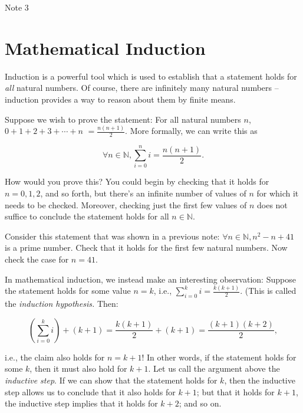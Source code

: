 \documentclass[12pt,a4paper]{article}
\theoremstyle{definition}
\begin{document}
\raggedright

\begin{center}
\huge{Note 3}
\end{center}

\section*{Mathematical Induction}
Induction is a powerful tool which is used to establish that a statement holds  for \textit{all} natural numbers. Of course, there are infinitely many natural numbers -- induction provides a way to reason about them by finite means.

\bigbreak

Suppose we wish to prove the statement: For all natural numbers $n$, $0+1+2+3+\cdots+n$ $=\frac{n(n+1)}{2}$. More formally, we can write this as

\begin{equation}
\forall n\in\mathbb{N}, \sum_{i=0}^{n}i=\frac{n(n+1)}{2}.
\end{equation}

How would you prove this? You could begin by checking that it holds for $n=0, 1, 2$, and so forth, but there's an infinite number of values of $n$ for which it needs to be checked. Moreover, checking just the first few values of $n$ does not suffice to conclude the statement holds for all $n\in\mathbb{N}$.

\bigbreak

Consider this statement that was shown in a previous note: $\forall n\in\mathbb{N}, n^2-n+41$ is a prime number. Check that it holds for the first few natural numbers. Now check the case for $n=41$.

\bigbreak

In mathematical induction, we instead make an interesting observation: Suppose the statement holds for some value $n=k$, i.e., $\sum_{i=0}^{k}i=\frac{k(k+1)}{2}$. (This is called the \textit{induction hypothesis.} Then:

\begin{equation}
\left(\sum_{i=0}^{k}i\right)+(k+1)=\frac{k(k+1)}{2}+(k+1)=\frac{(k+1)(k+2)}{2},
\end{equation}

i.e., the claim also holds for $n=k+1$! In other words, if the statement holds for some $k$, then it must also hold for $k+1$. Let us call the argument above the \textit{inductive step}. If we can show that the statement holds for $k$, then the inductive step allows us to conclude that it also holds for $k+1$; but that it holds for $k+1$, the inductive step implies that it holds for $k+2$; and so on.
\end{document}
